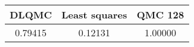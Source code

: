\begin{tabular}{|c|c|c|}
\hline
DLQMC&Least squares&QMC 128\\ 
\hline

0.79415 & 0.12131 & 1.00000\\ 
\hline
\end{tabular}

